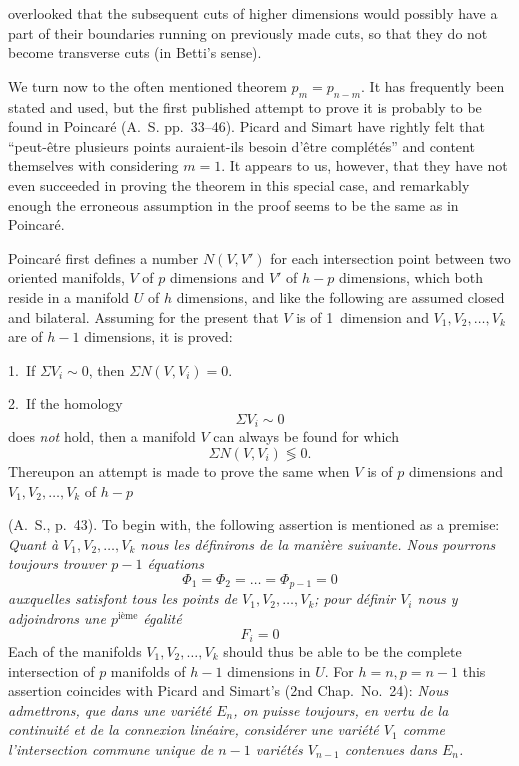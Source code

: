 \documentclass{article}
\begin{document}
overlooked that the subsequent cuts of higher dimensions would possibly have a part of their boundaries running on previously made cuts, so that they do not become transverse cuts (in Betti's sense).

We turn now to the often mentioned theorem $p_m = p_{n-m}$. It has frequently been stated and used, but the first published attempt to prove it is probably to be found in Poincaré (A.~S. pp.\ 33--46). Picard and Simart have rightly felt that ``peut-être plusieurs points auraient-ils besoin d'être complétés'' and content themselves with considering $m = 1$. It appears to us, however, that they have not even succeeded in proving the theorem in this special case, and remarkably enough the erroneous assumption in the proof seems to be the same as in Poincaré.

Poincaré first defines a number $N(V, V')$ for each intersection point between two oriented manifolds, $V$ of $p$ dimensions and $V'$ of $h - p$ dimensions, which both reside in a manifold $U$ of $h$ dimensions, and like the following are assumed closed and bilateral. Assuming for the present that $V$ is of 1~dimension and $V_1, V_2, \dots, V_k$ are of $h - 1$ dimensions, it is proved:

1.~If $\Sigma V_i \sim 0$, then $\Sigma N(V, V_i) = 0$.

2.~If the homology
\[
\Sigma V_i \sim 0
\]
does \emph{not} hold, then a manifold $V$ can always be found for which
\[
\Sigma N(V, V_i) \lessgtr 0.
\]
Thereupon an attempt is made to prove the same when $V$ is of $p$ dimensions and $V_1, V_2, \dots, V_k$ of $h - p$

(A.~S., p.\ 43). To begin with, the following assertion is mentioned as a premise: \emph{Quant à $V_1, V_2, \dots, V_k$ nous les définirons de la manière suivante. Nous pourrons toujours trouver $p - 1$ équations}
\[
\Phi_1 = \Phi_2 = \dots = \Phi_{p-1} = 0
\]
\emph{auxquelles satisfont tous les points de $V_1, V_2, \dots, V_k$; pour définir $V_i$ nous y adjoindrons une $p^{\text{ième}}$ égalité}
\[
F_i = 0
\]
Each of the manifolds $V_1, V_2, \dots, V_k$ should thus be able to be the complete intersection of $p$ manifolds of $h - 1$ dimensions in $U$. For $h = n, p = n - 1$ this assertion coincides with Picard and Simart's (2nd Chap.\ No.\ 24): \emph{Nous admettrons, que dans une variété $E_n$, on puisse toujours, en vertu de la continuité et de la connexion linéaire, considérer une variété $V_1$ comme l'intersection commune unique de $n - 1$ variétés $V_{n-1}$ contenues dans $E_n$.}
\end{document}
